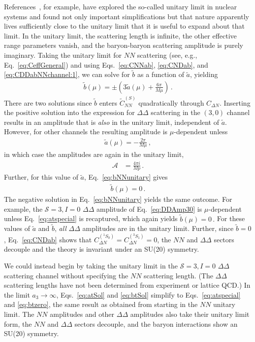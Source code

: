 \documentclass[nofootinbib, preprint, aps, prc, superscriptaddress,11pt]{revtex4-1}
\newcommand{\NN}{\ensuremath{N\!N}\xspace}
\newcommand{\calA}{\ensuremath{\mathcal{A}}}
\newcommand{\1}{\mathbbm{1}}
\newcommand{\CDN}{\ensuremath{C_{\Delta N}}\xspace}
\newcommand{\CNDsing}{\ensuremath{C_{\Delta N}^{(^1 \! S_0)}}\xspace}
\newcommand{\CNDtrip}{\ensuremath{C_{\Delta N}^{(^3 \! S_1)}}\xspace}
\newcommand{\Ceff}{\ensuremath{\widetilde C_{\NN}^{(S)}}\xspace}
\newcommand{\at}{\ensuremath{\tilde{a}}\xspace}
\newcommand{\bt}{\ensuremath{\tilde{b}}\xspace}
\newcommand{\aDDthreezero}{\ensuremath{a_3}\xspace}
\newcommand{\DD}{\ensuremath{\Delta\Delta}\xspace}
\begin{document}
References~\cite{Braaten:2003eu,Kievsky:2015zga,Kievsky:2015dtk,Konig:2016utl,Teng:2024exc}, for example, have explored the so-called unitary limit in nuclear systems and found not only important simplifications but that nature apparently lives sufficiently close to the unitary limit that it is useful to expand about that limit.  
In the unitary limit, the scattering length is infinite, the other effective range parameters vanish, and the baryon-baryon scattering amplitude is purely imaginary.
Taking the unitary limit for \NN scattering (see, e.g., Eq.~\eqref{eq:CeffGeneral}) and using Eqs.~\eqref{eq:CNNab}, \eqref{eq:CNDab}, and \eqref{eq:CDDabNNchannel:1}, we can solve for \bt as a function of \at, yielding 
\begin{align}
\label{eq:bNNunitary}
    \bt(\mu) = \pm \left( 3\at(\mu) +\frac{6\pi}{M \mu} \right) \, .
\end{align}
There are two solutions since \bt enters \Ceff quadratically through \CDN.
Inserting the positive solution into the expression for \DD scattering  in the $(3,0)$ channel results in an amplitude that is \emph{also} in the unitary limit, independent of \at. 
However, for other channels the resulting amplitude is $\mu$-dependent unless 
\begin{align}
\label{eq:atspecial}
    \at(\mu) = -\frac{2\pi}{M \mu}\, ,
\end{align}
in which case the amplitudes are again in the unitary limit,
\begin{align}
        \calA & = \frac{4 \pi i}{M p} \, .
    \end{align}
Further, for this value of $\at$, Eq.~\eqref{eq:bNNunitary} gives
\begin{align}
\label{eq:btzero}
    \bt(\mu) = 0 \, .
\end{align}
The negative solution in Eq.~\eqref{eq:bNNunitary} yields the same outcome. 
For example, the $\mathscr{S} = 3, I = 0$ \DD amplitude of Eq.~\eqref{eq:DDAmp30} is $\mu$-dependent unless Eq.~\eqref{eq:atspecial} is recaptured, which again yields
$
\bt(\mu) = 0 \, .
$
For these values of $\at$ and $\bt$, \emph{all} \DD amplitudes are in the unitary limit. Further, since $\bt=0$, Eq.~\eqref{eq:CNDab} shows that $\CNDsing=\CNDtrip = 0$, the \NN and \DD sectors decouple and the theory is invariant under an SU(20) symmetry.

We could instead begin by taking the unitary limit in the $\mathscr{S} = 3, I=0$ \DD scattering channel without specifying the \NN scattering length. (The \DD scattering lengths have not been determined from experiment or lattice QCD.)
In the limit $\aDDthreezero \to \infty$, Eqs.~\eqref{eq:atSol} and \eqref{eq:btSol} simplify to Eqs.~\eqref{eq:atspecial} and \eqref{eq:btzero}, the same result as obtained from starting in the \NN unitary limit. The \NN amplitudes and other \DD amplitudes also take their unitary limit form, the \NN and \DD sectors decouple, and the baryon interactions show an SU(20) symmetry.
\end{document}
